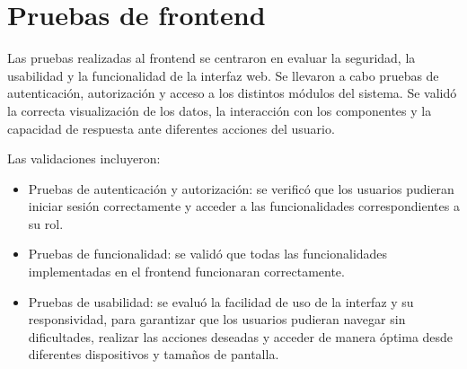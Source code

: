 


\section{Pruebas de frontend}
\label{sec:pruebas_frontend}

Las pruebas realizadas al frontend se centraron en evaluar la seguridad, la
usabilidad y la funcionalidad de la interfaz web. Se llevaron a cabo pruebas de
autenticación, autorización y acceso a los distintos módulos del sistema. Se
validó la correcta visualización de los datos, la interacción con los
componentes y la capacidad de respuesta ante diferentes acciones del usuario.

Las validaciones incluyeron:

\begin{itemize}
    \item Pruebas de autenticación y autorización: se verificó que los usuarios pudieran
          iniciar sesión correctamente y acceder a las funcionalidades correspondientes a
          su rol.
    \item Pruebas de funcionalidad: se validó que todas las funcionalidades implementadas
          en el frontend funcionaran correctamente.
    \item Pruebas de usabilidad: se evaluó la facilidad de uso de la interfaz y su
          responsividad, para garantizar que los usuarios pudieran navegar sin
          dificultades, realizar las acciones deseadas y acceder de manera óptima desde
          diferentes dispositivos y tamaños de pantalla.
\end{itemize}

